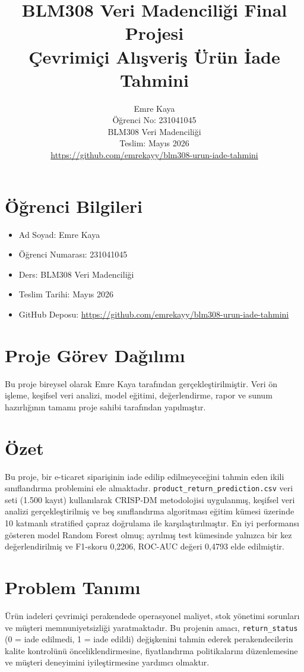 \documentclass[12pt,a4paper]{report}
\title{%
    \textbf{BLM308 Veri Madenciliği Final Projesi}\\[0.4cm]
  \Large Çevrimiçi Alışveriş Ürün İade Tahmini
}
\author{Emre Kaya\\Öğrenci No: 231041045\\BLM308 Veri Madenciliği\\Teslim: Mayıs 2026\\\url{https://github.com/emrekayy/blm308-urun-iade-tahmini}}
\date{}
\begin{document}
\maketitle
\tableofcontents
\newpage

\chapter*{Öğrenci Bilgileri}
\begin{itemize}
    \item Ad Soyad: Emre Kaya
    \item Öğrenci Numarası: 231041045
    \item Ders: BLM308 Veri Madenciliği
    \item Teslim Tarihi: Mayıs 2026
    \item GitHub Deposu: \url{https://github.com/emrekayy/blm308-urun-iade-tahmini}
\end{itemize}

\chapter*{Proje Görev Dağılımı}
Bu proje bireysel olarak Emre Kaya tarafından gerçekleştirilmiştir. Veri ön işleme, keşifsel veri analizi, model eğitimi, değerlendirme, rapor ve sunum hazırlığının tamamı proje sahibi tarafından yapılmıştır.

\chapter*{Özet}
Bu proje, bir e-ticaret siparişinin iade edilip edilmeyeceğini tahmin eden ikili sınıflandırma problemini ele almaktadır.
\texttt{product\_return\_prediction.csv} veri seti (1.500 kayıt) kullanılarak CRISP-DM metodolojisi uygulanmış, keşifsel veri analizi gerçekleştirilmiş ve beş sınıflandırma algoritması eğitim kümesi üzerinde 10 katmanlı stratified çapraz doğrulama ile karşılaştırılmıştır.
En iyi performansı gösteren model Random Forest olmuş; ayrılmış test kümesinde yalnızca bir kez değerlendirilmiş ve F1-skoru 0,2206, ROC-AUC değeri 0,4793 elde edilmiştir.

\chapter{Problem Tanımı}
Ürün iadeleri çevrimiçi perakendede operasyonel maliyet, stok yönetimi sorunları ve müşteri memnuniyetsizliği yaratmaktadır.
Bu projenin amacı, \texttt{return\_status} (0 = iade edilmedi, 1 = iade edildi) değişkenini tahmin ederek perakendecilerin kalite kontrolünü önceliklendirmesine, fiyatlandırma politikalarını düzenlemesine ve müşteri deneyimini iyileştirmesine yardımcı olmaktır.
\end{document}
